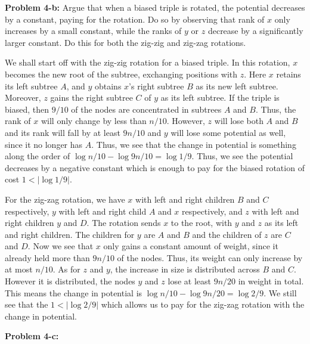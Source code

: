 \documentclass[psamsfonts]{amsart}
\newenvironment{sol}{\vspace{0.25cm}{\large \bfseries Solution:}}{\qedsymbol}
\newenvironment{prob}[1]{\begin{framed}{\large \bfseries Problem #1:}}{\end{framed}}
\begin{document}
\begin{prob}{4-b}
Argue that when a biased triple is rotated, the potential decreases by a constant, paying for the rotation. Do so by observing that rank of $x$ only increases by a small constant, while the ranks of $y$ or $z$ decrease by a significantly larger constant. Do this for both the zig-zig and zig-zag rotations.
\end{prob}
\begin{sol}
We shall start off with the zig-zig rotation for a biased triple. In this rotation, $x$ becomes the new root of the subtree, exchanging positions with $z$. Here $x$ retains its left subtree $A$, and $y$ obtains $x$'s right subtree $B$ as its new left subtree. Moreover, $z$ gains the right subtree $C$ of $y$ as its left subtree. If the triple is biased, then $9/10$ of the nodes are concentrated in subtrees $A$ and $B$. Thus, the rank of $x$ will only change by less than $n/10$. However, $z$ will lose both $A$ and $B$ and its rank will fall by at least $9n/10$ and $y$ will lose some potential as well, since it no longer has $A$. Thus, we see that the change in potential is something along the order of $\log n/10 - \log 9n/10 = \log 1/9$. Thus, we see the potential decreases by a negative constant which is enough to pay for the biased rotation of cost $1 < | \log 1/9 |$. 

For the zig-zag rotation, we have $x$ with left and right children $B$ and $C$ respectively, $y$ with left and right child $A$ and $x$ respectively, and $z$ with left and right children $y$ and $D$. The rotation sends $x$ to the root, with $y$ and $z$ as its left and right children. The children for $y$ are $A$ and $B$ and the children of $z$ are $C$ and $D$. Now we see that $x$ only gains a constant amount of weight, since it already held more than $9n/10$ of the nodes. Thus, its weight can only increase by at most $n/10$. As for $z$ and $y$, the increase in size is distributed across $B$ and $C$. However it is distributed, the nodes $y$ and $z$ lose at least $9n/20$ in weight in total. This means the change in potential is $\log n/10 - \log 9n/20 = \log 2/9$. We still see that the $1 < |\log 2/9|$ which allows us to pay for the zig-zag rotation with the change in potential.
\end{sol}

\begin{prob}{4-c}

\end{prob}

\begin{sol}

\end{sol}
\end{document}
